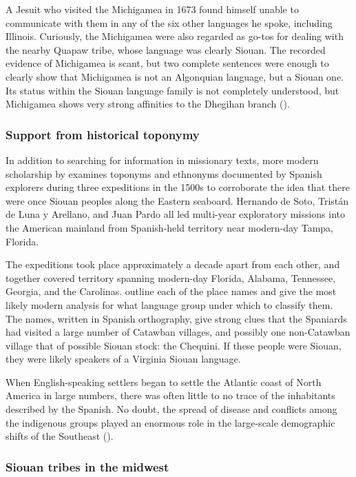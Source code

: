 \documentclass[output=paper]{LSP/langsci}
\begin{document}
A Jesuit who visited the Michigamea in 1673 found himself unable to communicate with them in any of the six other languages he spoke, including Illinois. Curiously, the Michigamea were also regarded as go-tos for dealing with the nearby Quapaw tribe, whose language was clearly Siouan. The recorded evidence of Michigamea is scant, but two complete sentences were enough to clearly show that Michigamea is not an Algonquian language, but a Siouan one. Its status within the Siouan language family is not completely understood, but Michigamea shows very strong affinities to the Dhegihan branch (\citealt{Koontz1995a,Koontz1995b}).

\subsubsection{Support from historical toponymy} In addition to searching for information in missionary texts, more modern scholarship by \citet{BookerEtAl1992} examines toponyms and ethnonyms documented by Spanish explorers during three expeditions in the 1500s to corroborate the idea that there were once Siouan peoples along the Eastern seaboard. Hernando de Soto, Trist\'an de Luna y Arellano, and Juan Pardo all led multi-year exploratory missions into the American mainland from Spanish-held territory near modern-day Tampa, Florida. 

The expeditions took place approximately a decade apart from each other, and together covered territory spanning modern-day Florida, Alabama, Tennessee, Georgia, and the Carolinas. \citet{BookerEtAl1992} outline each of the place names and give the most likely modern analysis for what language group under which to classify them. The names, written in Spanish orthography, give strong clues that the Spaniards had visited a large number of Catawban villages, and possibly one non-Catawban village that of possible Siouan stock: the Chequini. If these people were Siouan, they were likely speakers of a Virginia Siouan language.

When English-speaking settlers began to settle the Atlantic coast of North America in large numbers, there was often little to no trace of the inhabitants described by the Spanish. No doubt, the spread of disease and conflicts among the indigenous groups played an enormous role in the large-scale demographic shifts of the Southeast (\citealt{Mann2006}). 

\subsubsection{Siouan tribes in the midwest}
\end{document}
